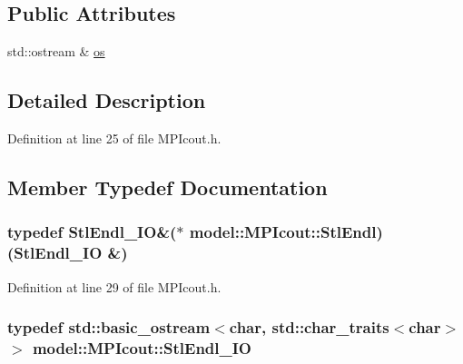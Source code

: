 \subsection*{Public Attributes}
\begin{DoxyCompactItemize}
\item 
std\+::ostream \& \hyperlink{structmodel_1_1_m_p_icout_a7d375aac88a5d15d09bb1542482ee6a1}{os}
\end{DoxyCompactItemize}


\subsection{Detailed Description}


Definition at line 25 of file M\+P\+Icout.\+h.



\subsection{Member Typedef Documentation}
\hypertarget{structmodel_1_1_m_p_icout_a8e2a24cb7708fe390e6c7599b6e3fc0c}{}
\subsubsection[{Stl\+Endl}]{\setlength{\rightskip}{0pt plus 5cm}typedef {\bf Stl\+Endl\+\_\+\+I\+O}\&($\ast$ model\+::\+M\+P\+Icout\+::\+Stl\+Endl) ({\bf Stl\+Endl\+\_\+\+I\+O} \&)}\label{structmodel_1_1_m_p_icout_a8e2a24cb7708fe390e6c7599b6e3fc0c}


Definition at line 29 of file M\+P\+Icout.\+h.

\hypertarget{structmodel_1_1_m_p_icout_a423b0351fcdc912e2179e2431717f82f}{}
\subsubsection[{Stl\+Endl\+\_\+\+I\+O}]{\setlength{\rightskip}{0pt plus 5cm}typedef std\+::basic\+\_\+ostream$<$char, std\+::char\+\_\+traits$<$char$>$ $>$ {\bf model\+::\+M\+P\+Icout\+::\+Stl\+Endl\+\_\+\+I\+O}}\label{structmodel_1_1_m_p_icout_a423b0351fcdc912e2179e2431717f82f}



